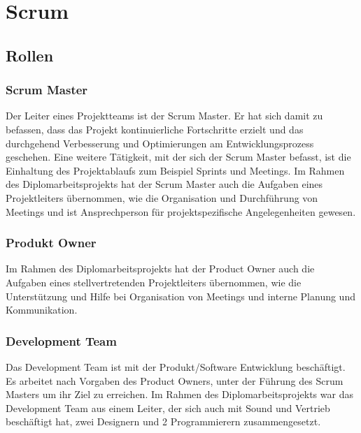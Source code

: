 
\section{Scrum}\label{sec:scrum}

\renewcommand{\kapitelautor}{Autor: Nils} %

\subsection{Rollen}\label{subsec:rollen}

%
\subsubsection{Scrum Master}\label{subsubsec:Scrum-Master}
%
Der Leiter eines Projektteams ist der Scrum Master. Er hat sich damit zu befassen, dass das Projekt kontinuierliche Fortschritte erzielt und das durchgehend Verbesserung und Optimierungen am Entwicklungsprozess geschehen.
Eine weitere Tätigkeit, mit der sich der Scrum Master befasst, ist die Einhaltung des Projektablaufs zum Beispiel Sprints und Meetings.
Im Rahmen des Diplomarbeitsprojekts hat der Scrum Master auch die Aufgaben eines Projektleiters übernommen, wie die Organisation und Durchführung von Meetings und ist Ansprechperson für projektspezifische Angelegenheiten gewesen.
%
\subsubsection{Produkt Owner}\label{subsubsec:Product-Owner}
%

Im Rahmen des Diplomarbeitsprojekts hat der Product Owner auch die Aufgaben eines stellvertretenden Projektleiters übernommen, wie die Unterstützung und Hilfe bei Organisation von Meetings und interne Planung und Kommunikation.
%
\subsubsection{Development Team}\label{subsubsec:Development-Team}
%
Das Development Team ist mit der Produkt/Software Entwicklung beschäftigt. Es arbeitet nach Vorgaben des Product Owners, unter der Führung des Scrum Masters um ihr Ziel zu erreichen.
Im Rahmen des Diplomarbeitsprojekts war das Development Team aus einem Leiter, der sich auch mit Sound und Vertrieb beschäftigt hat, zwei Designern und 2 Programmierern zusammengesetzt.
%
